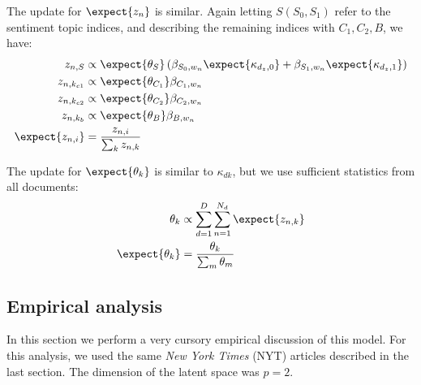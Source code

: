 The update for $\expect{z_{n}}$ is similar.  Again letting $S (S_0,
S_1)$ refer to the sentiment topic indices, and describing the
remaining indices with $C_1, C_2, B$, we have:
\begin{align}
  z_{n,S} & \propto \expect{\theta_{S}} \left( \beta_{S_0,w_n} \expect{\kappa_{d_z, 0}} + \beta_{S_1,w_n} \expect{\kappa_{d_z, 1}} \right) \nonumber \\
  z_{n,k_{c1}} & \propto \expect{\theta_{C_1}} \beta_{C_1,w_n}  \nonumber \\
  z_{n,k_{c2}} & \propto \expect{\theta_{C_2}} \beta_{C_2,w_n} \nonumber \\
  z_{n,k_{b}} & \propto \expect{\theta_{B}} \beta_{B,w_n} \nonumber \\
  \expect{z_{n,i}} & = \frac{ z_{n,i}} { \sum_k z_{n,k} } \label{equation:fr_e_z}
\end{align}

The update for $\expect{\theta_k}$ is similar to $\kappa_{dk}$, but we use sufficient statistics from all documents:
\begin{align}
  \theta_{k} & \propto \sum_{d=1}^D \sum_{n=1}^{N_d} \expect{z_{n,k}} \nonumber \\
  \expect{\theta_{k}} & = \frac{\theta_{k}} { \sum_m \theta_{m} } \nonumber \\
\end{align}

\subsection{Empirical analysis}
In this section we perform a very cursory empirical discussion of this
model. For this analysis, we used the same \emph{New York Times} (NYT)
articles described in the last section.  The dimension of the latent
space was $p=2$.


